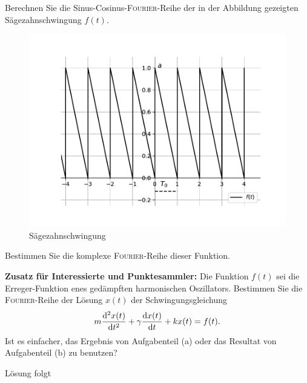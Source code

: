 \documentclass{atistandalonetask}
\begin{document}
  \begin{atiTask}[
    title = Sägezahnschwingung
  ]


	\begin{atiSubtasks}
		\item Berechnen Sie die Sinus-Cosinus-\textsc{Fourier}-Reihe der in der Abbildung gezeigten Sägezahnschwingung $f(t)$.
		\begin{figure}[H]
			\centering
			\includegraphics[width=0.70\linewidth]{picture-fourier_v}
			\caption{Sägezahnschwingung}
			\end{figure}
		\item Bestimmen Sie die komplexe \textsc{Fourier}-Reihe dieser Funktion.
		\item \textbf{Zusatz für Interessierte und Punktesammler:} Die Funktion $f(t)$ sei die Erreger-Funktion enes gedämpften harmonischen Oszillators. Bestimmen Sie die \textsc{Fourier}-Reihe der Lösung $x(t)$ der Schwingungsgleichung
			\[
			m\leibnizDerivative[2]{x(t)}{t}+\gamma \leibnizDerivative{x(t)}{t}+kx(t)=f(t).
			\]	
		Ist es einfacher, das Ergebnis von Aufgabenteil (a) oder das Resultat von Aufgabenteil (b) zu benutzen?	
	\end{atiSubtasks} 
  \end{atiTask}
  \begin{atiSolution}
   Lösung folgt
  \end{atiSolution}
\end{document}
